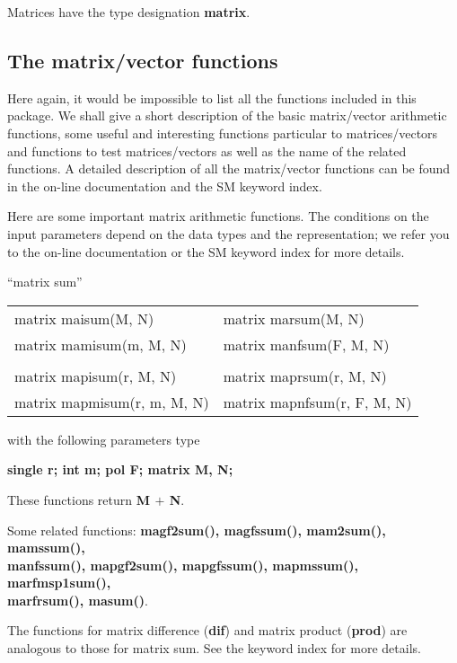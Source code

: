 Matrices have the type designation {\bf matrix}.

\subsection{The matrix/vector functions}
Here again, it would be impossible to list all the functions included in this
package. We shall give a short description of the basic matrix/vector 
arithmetic functions, some useful and interesting functions particular to
matrices/vectors and functions to test matrices/vectors as well as the name
of the related functions. A detailed description of all the matrix/vector
functions can be found in the on-line documentation and the SM keyword index.

Here are some important matrix arithmetic functions. The conditions on the 
input parameters depend on the data types and the representation; we refer
you to the on-line documentation or the SM keyword index for more details.

\leer
\begin{center} ``matrix sum'' \end{center}
\begin{center}
{\bf
\begin{tabular}{ll}
matrix maisum(M, N)   & matrix marsum(M, N)   \\
matrix mamisum(m, M, N)&  matrix manfsum(F, M, N) \\
&\\
matrix mapisum(r, M, N)   & matrix maprsum(r, M, N) \\
matrix mapmisum(r, m, M, N) & matrix mapnfsum(r, F, M, N) \\
\end{tabular} }
\end{center}
\parbox[t]{2.5in}{with the following parameters type}
\parbox[t]{3.0in}{
\bf single r;\newline
    int m;\newline
    pol F;\newline
    matrix M, N;}

These functions return {\bf M $+$ N}.

Some related functions:\hspace*{0.7em}
{\bf  magf2sum(), magfssum(), mam2sum(), mamssum(), \\
manfssum(), mapgf2sum(), mapgfssum(), mapmssum(), marfmsp1sum(), \\
marfrsum(), masum()}.

The functions for matrix difference ({\bf *dif}) and matrix product
({\bf *prod}) are analogous to those for matrix sum. See the keyword
index for more details.


